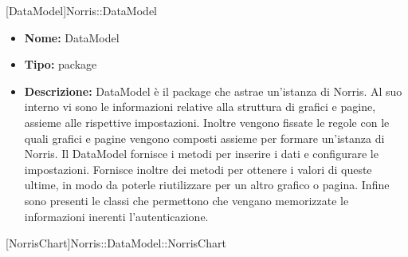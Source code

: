 
			[DataModel]{Norris::DataModel}
			

	

			\begin{itemize}
			\item \textbf{Nome:} DataModel
			\item \textbf{Tipo:} package
			
			\item \textbf{Descrizione:} DataModel è il package che astrae un’istanza di Norris. Al suo interno vi sono le informazioni relative alla struttura di grafici e pagine, assieme alle rispettive impostazioni. Inoltre vengono fissate le regole con le quali grafici e pagine vengono composti assieme per formare un’istanza di Norris. Il DataModel fornisce i metodi per inserire i dati e configurare le impostazioni. Fornisce inoltre dei metodi per ottenere i valori di queste ultime, in modo da poterle riutilizzare per un altro grafico o pagina. Infine sono presenti le classi che permettono che vengano memorizzate le informazioni inerenti l’autenticazione.

			\end{itemize}

			
			[NorrisChart]{Norris::DataModel::NorrisChart}
			

